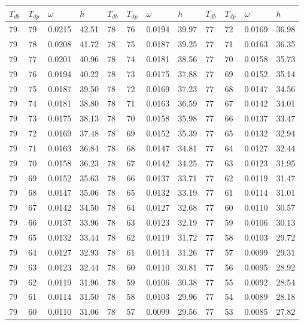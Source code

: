 \begin{tabular}{llll|llll|llll}
 \toprule 
\(T_{db}\) & \(T_{dp}\) & \(\omega\) & \(h\) & \(T_{db}\) & \(T_{dp}\) & \(\omega\) & \(h\) & \(T_{db}\) & \(T_{dp}\) & \(\omega\) & \(h\)  \\ \midrule 
79 & 79 & 0.0215 & 42.51 & 78 & 76 & 0.0194 & 39.97 & 77 & 72 & 0.0169 & 36.98\\
79 & 78 & 0.0208 & 41.72 & 78 & 75 & 0.0187 & 39.25 & 77 & 71 & 0.0163 & 36.35\\
79 & 77 & 0.0201 & 40.96 & 78 & 74 & 0.0181 & 38.56 & 77 & 70 & 0.0158 & 35.73\\
79 & 76 & 0.0194 & 40.22 & 78 & 73 & 0.0175 & 37.88 & 77 & 69 & 0.0152 & 35.14\\
79 & 75 & 0.0187 & 39.50 & 78 & 72 & 0.0169 & 37.23 & 77 & 68 & 0.0147 & 34.56\\
79 & 74 & 0.0181 & 38.80 & 78 & 71 & 0.0163 & 36.59 & 77 & 67 & 0.0142 & 34.01\\
79 & 73 & 0.0175 & 38.13 & 78 & 70 & 0.0158 & 35.98 & 77 & 66 & 0.0137 & 33.47\\
79 & 72 & 0.0169 & 37.48 & 78 & 69 & 0.0152 & 35.39 & 77 & 65 & 0.0132 & 32.94\\
79 & 71 & 0.0163 & 36.84 & 78 & 68 & 0.0147 & 34.81 & 77 & 64 & 0.0127 & 32.44\\
79 & 70 & 0.0158 & 36.23 & 78 & 67 & 0.0142 & 34.25 & 77 & 63 & 0.0123 & 31.95\\
79 & 69 & 0.0152 & 35.63 & 78 & 66 & 0.0137 & 33.71 & 77 & 62 & 0.0119 & 31.47\\
79 & 68 & 0.0147 & 35.06 & 78 & 65 & 0.0132 & 33.19 & 77 & 61 & 0.0114 & 31.01\\
79 & 67 & 0.0142 & 34.50 & 78 & 64 & 0.0127 & 32.68 & 77 & 60 & 0.0110 & 30.57\\
79 & 66 & 0.0137 & 33.96 & 78 & 63 & 0.0123 & 32.19 & 77 & 59 & 0.0106 & 30.13\\
79 & 65 & 0.0132 & 33.44 & 78 & 62 & 0.0119 & 31.72 & 77 & 58 & 0.0103 & 29.72\\
79 & 64 & 0.0127 & 32.93 & 78 & 61 & 0.0114 & 31.26 & 77 & 57 & 0.0099 & 29.31\\
79 & 63 & 0.0123 & 32.44 & 78 & 60 & 0.0110 & 30.81 & 77 & 56 & 0.0095 & 28.92\\
79 & 62 & 0.0119 & 31.96 & 78 & 59 & 0.0106 & 30.38 & 77 & 55 & 0.0092 & 28.54\\
79 & 61 & 0.0114 & 31.50 & 78 & 58 & 0.0103 & 29.96 & 77 & 54 & 0.0089 & 28.18\\
79 & 60 & 0.0110 & 31.06 & 78 & 57 & 0.0099 & 29.56 & 77 & 53 & 0.0085 & 27.82\\

\end{tabular}
